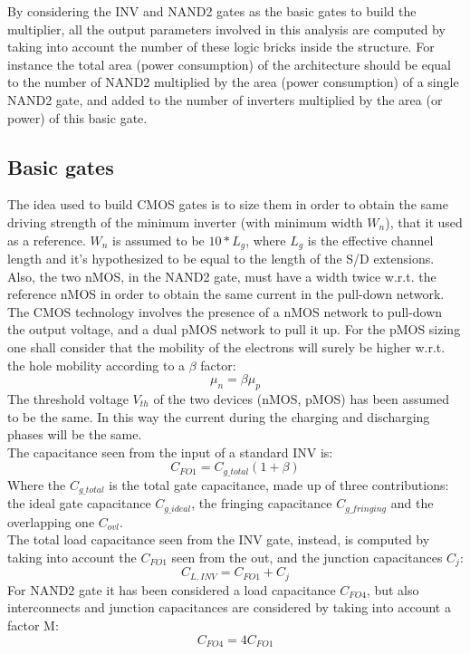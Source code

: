 \documentclass[11pt]{article} %
\begin{document}
\vspace{1em}
By considering the INV and NAND2 gates as the basic gates to build the multiplier, all the output parameters involved in this analysis are computed by taking into account the number of these logic bricks inside the structure. For instance the total area (power consumption) of the architecture should be equal to the number of NAND2 multiplied by the area (power consumption) of a single NAND2 gate, and added to the number of inverters multiplied by the area (or power) of this basic gate.\\
\vspace{2em}
\subsection{Basic gates}
The idea used to build CMOS gates is to size them in order to obtain the same driving strength of the minimum inverter (with minimum width $W_{n}$), that it used as a reference. $W_{n}$ is assumed to be $10*L_{g}$, where $ L_{g}$ is the effective channel length and it’s hypothesized to be equal to the length of the S/D extensions. Also, the two nMOS, in the NAND2 gate, must have a width twice w.r.t. the reference nMOS in order to obtain the same current in the pull-down network.\\
The CMOS technology involves the presence of a nMOS network to pull-down the output voltage, and a dual pMOS network to pull it up. For the pMOS sizing one shall consider that the mobility of the electrons will surely be higher w.r.t. the hole mobility according to a $\beta$ factor:
$$\mu_{n} = \beta \mu_{p} $$
The threshold voltage $V_{th}$ of the two devices (nMOS, pMOS) has been assumed to be the same. In this way the current during the charging and discharging phases will be the same. \\
The capacitance seen from the input of a standard INV is:
$$C_{FO1} = C_{g\_total}(1 + \beta)$$
Where the $C_{g\_total}$ is the total gate capacitance, made up of three contributions: the ideal gate capacitance $C_{g\_ideal}$, the fringing capacitance $C_{g\_fringing}$ and the overlapping one $C_{ovl}$.\\
The total load capacitance seen from the INV gate, instead, is computed by taking into account the $C_{FO1}$ seen from the out, and the junction capacitances $C_{j}$:
$$C_{L,INV}=C_{FO1}+ C_{j}$$
For NAND2 gate it has been considered a load capacitance $C_{FO4}$, but also interconnects and junction capacitances are considered by taking into account a factor M: 
$$C_{FO4} = 4 C_{FO1}$$
\end{document}
